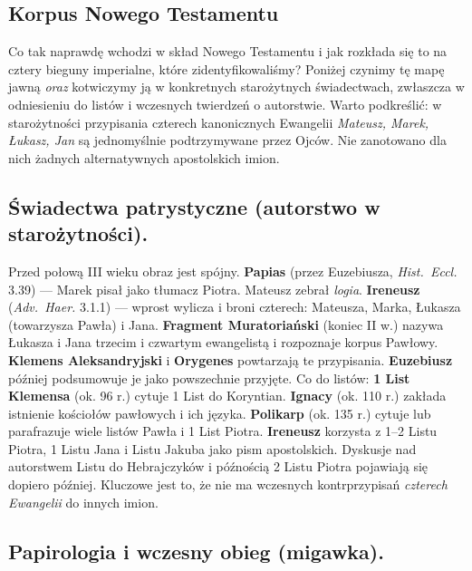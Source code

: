 \subsection{Korpus Nowego Testamentu}\label{subsec:the-corpus-of-the-new-testament}

Co tak naprawdę wchodzi w skład Nowego Testamentu i jak rozkłada się to na cztery bieguny imperialne, które zidentyfikowaliśmy?
Poniżej czynimy tę mapę jawną \emph{oraz} kotwiczymy ją w konkretnych starożytnych świadectwach, zwłaszcza w odniesieniu do listów i wczesnych twierdzeń o autorstwie.
Warto podkreślić: w starożytności przypisania czterech kanonicznych Ewangelii \textit{Mateusz, Marek, Łukasz, Jan} są jednomyślnie podtrzymywane przez Ojców.
Nie zanotowano dla nich żadnych alternatywnych apostolskich imion.

\subsection{Świadectwa patrystyczne (autorstwo w starożytności).}

Przed połową III wieku obraz jest spójny.
\textbf{Papias} (przez Euzebiusza, \textit{Hist.\ Eccl.} 3.39) — Marek pisał jako tłumacz Piotra.
Mateusz zebrał \textit{logia}.
\textbf{Ireneusz} (\textit{Adv.\ Haer.} 3.1.1) — wprost wylicza i broni czterech: Mateusza, Marka, Łukasza (towarzysza Pawła) i Jana.
\textbf{Fragment Muratoriański} (koniec II w.) nazywa Łukasza i Jana trzecim i czwartym ewangelistą i rozpoznaje korpus Pawłowy.
\textbf{Klemens Aleksandryjski} i \textbf{Orygenes} powtarzają te przypisania.
\textbf{Euzebiusz} później podsumowuje je jako powszechnie przyjęte.
Co do listów: \textbf{1 List Klemensa} (ok. 96 r.) cytuje 1 List do Koryntian.
\textbf{Ignacy} (ok. 110 r.) zakłada istnienie kościołów pawłowych i ich języka.
\textbf{Polikarp} (ok. 135 r.) cytuje lub parafrazuje wiele listów Pawła i 1 List Piotra.
\textbf{Ireneusz} korzysta z 1–2 Listu Piotra, 1 Listu Jana i Listu Jakuba jako pism apostolskich.
Dyskusje nad autorstwem Listu do Hebrajczyków i późnością 2 Listu Piotra pojawiają się dopiero później.
Kluczowe jest to, że nie ma wczesnych kontrprzypisań \emph{czterech Ewangelii} do innych imion.

\subsection{Papirologia i wczesny obieg (migawka).}

